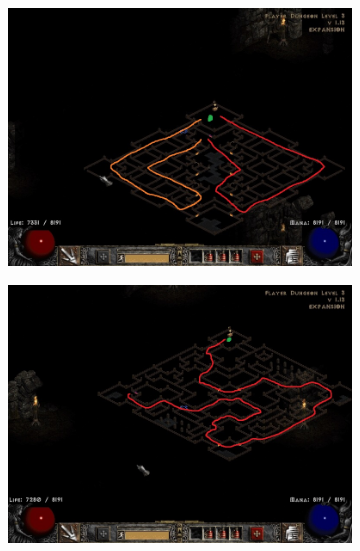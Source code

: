 \begin{figure}[H]
	\smallskip
	\begin{subfigure}{0.495\hsize}
		\centering
		\includegraphics[width=\hsize]{Assets/FlayerDungeon3_3}
	\end{subfigure}
	\hfill
	\begin{subfigure}{0.495\hsize}
		\centering
		\includegraphics[width=\hsize]{Assets/FlayerDungeon3_4}
	\end{subfigure}


\end{figure}

